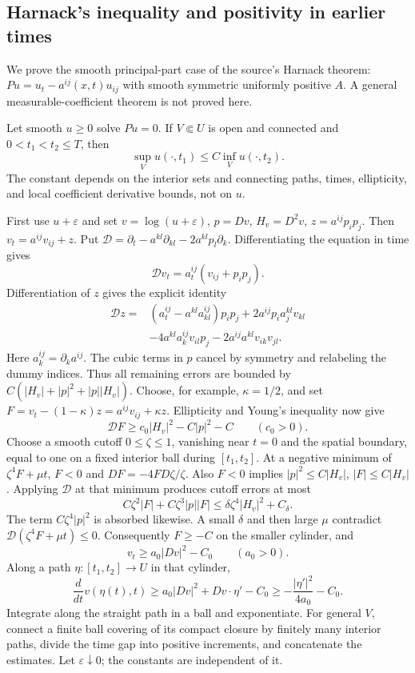 \subsection{Harnack's inequality and positivity in earlier times}
We prove the smooth principal-part case of the source's Harnack theorem:
$Pu=u_t-a^{ij}(x,t)u_{ij}$ with smooth symmetric uniformly positive $A$.
A general measurable-coefficient theorem is not proved here.
\Needspace{55mm}
\begin{theorem}
\label{thm:7-harnack}
Let smooth $u\geq0$ solve $Pu=0$. If $V\Subset U$ is open and connected and
$0<t_1<t_2\leq T$, then
\[
 \sup_Vu(\cdot,t_1)\leq C\inf_Vu(\cdot,t_2).
\]
The constant depends on the interior sets and connecting paths, times,
ellipticity, and local coefficient derivative bounds, not on $u$.
\end{theorem}
\begin{expandedproof}
First use $u+\varepsilon$ and set $v=\log(u+\varepsilon)$, $p=Dv$,
$H_v=D^2v$, $z=a^{ij}p_i p_j$. Then $v_t=a^{ij}v_{ij}+z$.
Put $\mathcal D=\partial_t-a^{kl}\partial_{kl}-2a^{kl}p_l\partial_k$.
Differentiating the equation in time gives
\[
 \mathcal Dv_t=a_t^{ij}(v_{ij}+p_ip_j).
\]
Differentiation of $z$ gives the explicit identity
\begin{align*}
 \mathcal Dz={}&(a_t^{ij}-a^{kl}a_{kl}^{ij})p_ip_j
 +2a^{ij}p_i a_j^{kl}v_{kl}\\
 &-4a^{kl}a_k^{ij}v_{il}p_j
 -2a^{ij}a^{kl}v_{ik}v_{jl}.
\end{align*}
Here $a_k^{ij}=\partial_k a^{ij}$. The cubic terms in $p$ cancel by
symmetry and relabeling the dummy indices. Thus all remaining errors are
bounded by $C(|H_v|+|p|^2+|p||H_v|)$.
Choose, for example, $\kappa=1/2$, and set
$F=v_t-(1-\kappa)z=a^{ij}v_{ij}+\kappa z$.
Ellipticity and Young's inequality now give
\[
 \mathcal DF\geq c_0|H_v|^2-C|p|^2-C\qquad(c_0>0).
\]
Choose a smooth cutoff $0\leq\zeta\leq1$, vanishing near $t=0$ and the
spatial boundary, equal to one on a fixed interior ball during $[t_1,t_2]$.
At a negative minimum of $\zeta^4F+\mu t$, $F<0$ and
$DF=-4F D\zeta/\zeta$. Also $F<0$ implies
$|p|^2\leq C|H_v|$, $|F|\leq C|H_v|$. Applying $\mathcal D$ at that
minimum produces cutoff errors at most
\[
 C\zeta^2|F|+C\zeta^3|p||F|
 \leq\delta\zeta^4|H_v|^2+C_\delta.
\]
The term $C\zeta^4|p|^2$ is absorbed likewise. A small $\delta$ and then
large $\mu$ contradict $\mathcal D(\zeta^4F+\mu t)\leq0$.
Consequently $F\geq-C$ on the smaller cylinder, and
\begin{equation}\label{eq:7-log-harnack}
 v_t\geq a_0|Dv|^2-C_0\qquad(a_0>0).
\end{equation}
Along a path $\eta:[t_1,t_2]\to U$ in that cylinder,
\[
 \frac d{dt}v(\eta(t),t)\geq
 a_0|Dv|^2+Dv\cdot\eta'-C_0
 \geq-\frac{|\eta'|^2}{4a_0}-C_0.
\]
Integrate along the straight path in a ball and exponentiate.
For general $V$, connect a finite ball covering of its compact closure by
finitely many interior paths, divide the time gap into positive increments,
and concatenate the estimates. Let $\varepsilon\downarrow0$; the constants
are independent of it.
\end{expandedproof}
